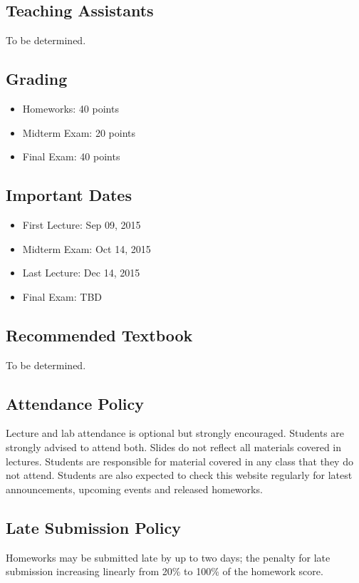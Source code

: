 \documentclass[12pt,letterpaper,twoside]{article}
\begin{document}
\subsection*{Teaching Assistants}
To be determined.

\subsection*{Grading}
\begin{itemize}
\item[] Homeworks: 40 points
\item[] Midterm Exam: 20 points
\item[] Final Exam: 40 points
\end{itemize}

\subsection*{Important Dates}
\begin{itemize}
\item[] First Lecture: Sep 09, 2015
\item[] Midterm Exam: Oct 14, 2015
\item[] Last Lecture: Dec 14, 2015
\item[] Final Exam: TBD
\end{itemize}

\subsection*{Recommended Textbook}
To be determined.

\subsection*{Attendance Policy}
Lecture and lab attendance is optional but strongly encouraged. Students are strongly advised to attend both. Slides do not reﬂect all materials covered in lectures. Students are responsible for material covered in any class that they do not attend. Students are also expected to check this website regularly for latest announcements, upcoming events and released homeworks.

\subsection*{Late Submission Policy}
Homeworks may be submitted late by up to two days; the penalty for late submission increasing linearly from 20\% to 100\% of the homework score.
\end{document}
